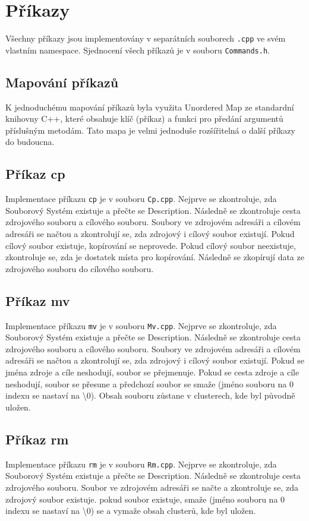 \documentclass[12pt, a4paper]{article}
\begin{document}
\section{Příkazy}
Všechny příkazy jsou implementovány v separátních souborech \texttt{.cpp} ve svém vlastním namespace.
Sjednocení všech příkazů je v souboru \texttt{Commands.h}.
\subsection{Mapování příkazů}
K jednoduchému mapování příkazů byla využita Unordered Map ze standardní knihovny C++, které obsahuje klíč (příkaz) a funkci pro předání argumentů příslušným metodám.
Tato mapa je velmi jednoduše rozšířitelná o další příkazy do budoucna.

\subsection{Příkaz cp}
Implementace příkazu \texttt{cp} je v souboru \texttt{Cp.cpp}.
Nejprve se zkontroluje, zda Souborový Systém existuje a přečte se Description.
Následně se zkontroluje cesta zdrojového souboru a cílového souboru.
Soubory ve zdrojovém adresáři a cílovém adresáři se načtou a zkontrolují se, zda zdrojový i cílový soubor existují.
Pokud cílový soubor existuje, kopírování se neprovede.
Pokud cílový soubor neexistuje, zkontroluje se, zda je dostatek místa pro kopírování.
Následně se zkopírují data ze zdrojového souboru do cílového souboru.

\subsection{Příkaz mv}
Implementace příkazu \texttt{mv} je v souboru \texttt{Mv.cpp}.
Nejprve se zkontroluje, zda Souborový Systém existuje a přečte se Description.
Následně se zkontroluje cesta zdrojového souboru a cílového souboru.
Soubory ve zdrojovém adresáři a cílovém adresáři se načtou a zkontrolují se, zda zdrojový i cílový soubor existují.
Pokud se jména zdroje a cíle neshodují, soubor se přejmenuje.
Pokud se cesta zdroje a cíle neshodují, soubor se přesune a předchozí soubor se smaže (jméno souboru na 0 indexu se nastaví na \textbackslash 0).
Obsah souboru zůstane v clusterech, kde byl původně uložen.

\subsection{Příkaz rm}
Implementace příkazu \texttt{rm} je v souboru \texttt{Rm.cpp}.
Nejprve se zkontroluje, zda Souborový Systém existuje a přečte se Description.
Následně se zkontroluje cesta zdrojového souboru.
Soubor ve zdrojovém adresáři se načte a zkontroluje se, zda zdrojový soubor existuje.
pokud soubor existuje, smaže (jméno souboru na 0 indexu se nastaví na \textbackslash 0) se a vymaže obsah clusterů, kde byl uložen.
\end{document}

